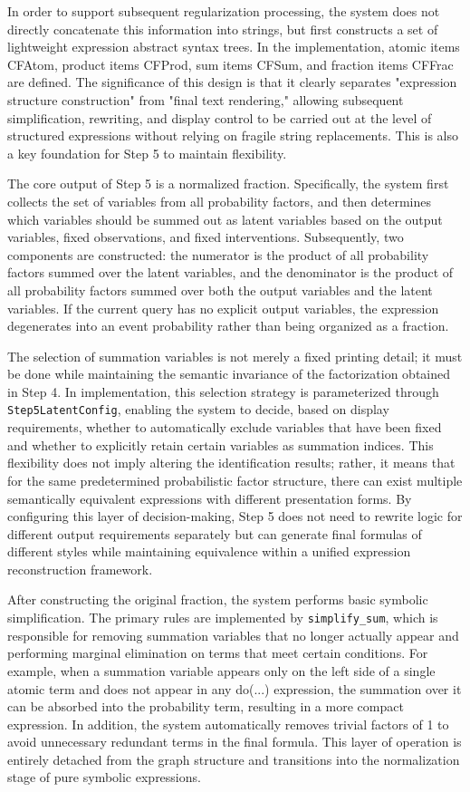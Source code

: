 \documentclass[a4paper]{report}
\begin{document}
In order to support subsequent regularization processing, the system does not directly concatenate this information into strings, but first constructs a set of lightweight expression abstract syntax trees. In the implementation, atomic items CFAtom, product items CFProd, sum items CFSum, and fraction items CFFrac are defined. The significance of this design is that it clearly separates "expression structure construction" from "final text rendering," allowing subsequent simplification, rewriting, and display control to be carried out at the level of structured expressions without relying on fragile string replacements. This is also a key foundation for Step 5 to maintain flexibility.

The core output of Step 5 is a normalized fraction. Specifically, the system first collects the set of variables from all probability factors, and then determines which variables should be summed out as latent variables based on the output variables, fixed observations, and fixed interventions. Subsequently, two components are constructed: the numerator is the product of all probability factors summed over the latent variables, and the denominator is the product of all probability factors summed over both the output variables and the latent variables. If the current query has no explicit output variables, the expression degenerates into an event probability rather than being organized as a fraction.

The selection of summation variables is not merely a fixed printing detail; it must be done while maintaining the semantic invariance of the factorization obtained in Step 4. In implementation, this selection strategy is parameterized through \texttt{Step5LatentConfig}, enabling the system to decide, based on display requirements, whether to automatically exclude variables that have been fixed and whether to explicitly retain certain variables as summation indices. This flexibility does not imply altering the identification results; rather, it means that for the same predetermined probabilistic factor structure, there can exist multiple semantically equivalent expressions with different presentation forms. By configuring this layer of decision-making, Step 5 does not need to rewrite logic for different output requirements separately but can generate final formulas of different styles while maintaining equivalence within a unified expression reconstruction framework.

After constructing the original fraction, the system performs basic symbolic simplification. The primary rules are implemented by \texttt{simplify\_sum}, which is responsible for removing summation variables that no longer actually appear and performing marginal elimination on terms that meet certain conditions. For example, when a summation variable appears only on the left side of a single atomic term and does not appear in any do(...) expression, the summation over it can be absorbed into the probability term, resulting in a more compact expression. In addition, the system automatically removes trivial factors of 1 to avoid unnecessary redundant terms in the final formula. This layer of operation is entirely detached from the graph structure and transitions into the normalization stage of pure symbolic expressions.
\end{document}

